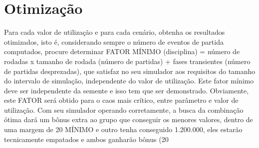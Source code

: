 \chapter{Otimização}
Para cada valor de utilização e para cada cenário, obtenha os resultados otimizados, isto é,
considerando sempre o número de eventos de partida computados, procure determinar
FATOR MÍNIMO (disciplina) = número de rodadas x tamanho de rodada (número de
partidas) + fases transientes (número de partidas desprezadas), que satisfaz no seu
simulador aos requisitos do tamanho do intervalo de simulação, independente do valor de
utilização. Este fator mínimo deve ser independente da semente e isso tem que ser
demonstrado.
Obviamente, este FATOR será obtido para o caos mais crítico, entre parâmetro e valor de
utilização. Com seu simulador operando corretamente, a busca da combinação ótima dará
um bônus extra ao grupo que conseguir os menores valores, dentro de uma margem de
20%
MÍNIMO e outro tenha conseguido 1.200.000, eles estarão tecnicamente empatados e
ambos ganharão bônus (20%
